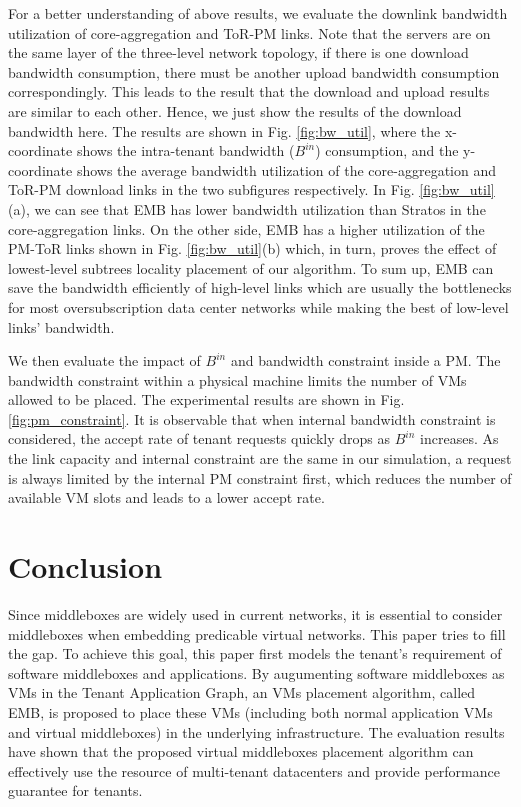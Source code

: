 \documentclass[review]{elsarticle}
\begin{document}
For a better understanding of above results, we evaluate the downlink bandwidth utilization of core-aggregation and ToR-PM links. Note that the servers are on the same layer of the three-level network topology, if there is one download bandwidth consumption, there must be another upload bandwidth consumption correspondingly. This leads to the result that the download and upload results are similar to each other. Hence, we just show the results of the download bandwidth here. The results are shown in Fig. \ref{fig:bw_util}, where the x-coordinate shows the intra-tenant bandwidth ($B^{in}$) consumption, and the y-coordinate shows the average bandwidth utilization of the core-aggregation and ToR-PM download links in the two subfigures respectively. In Fig. \ref{fig:bw_util}(a), we can see that EMB has lower bandwidth utilization than Stratos in the core-aggregation links. On the other side, EMB has a higher utilization of the PM-ToR links shown in Fig. \ref{fig:bw_util}(b) which, in turn, proves the effect of lowest-level subtrees locality placement of our algorithm. To sum up, EMB can save the bandwidth efficiently of high-level links which are usually the bottlenecks for most oversubscription data center networks while making the best of low-level links’ bandwidth. 

We then evaluate the impact of $B^{in}$ and bandwidth constraint inside a PM. The bandwidth constraint within a physical machine limits the number of VMs allowed to be placed. The experimental results are shown in Fig. \ref{fig:pm_constraint}. It is observable that when internal bandwidth constraint is considered, the accept rate of tenant requests quickly drops as $B^{in}$ increases. As the link capacity and internal constraint are the same in our simulation, a request is always limited by the internal PM constraint first, which reduces the number of available VM slots and leads to a lower accept rate.

\section{Conclusion}\label{sec:final}
Since middleboxes are widely used in current networks, it is essential to consider middleboxes when embedding predicable virtual networks. This paper tries to fill the gap. To achieve this goal, this paper first models the tenant's requirement of software middleboxes and applications. By augumenting software middleboxes as VMs in the Tenant Application Graph, an VMs placement algorithm, called EMB, is proposed to place these VMs (including both normal application VMs and virtual middleboxes) in the underlying infrastructure. The evaluation results have shown that the proposed virtual middleboxes placement algorithm can effectively use the resource of multi-tenant datacenters and provide performance guarantee for tenants.   
\end{document}
